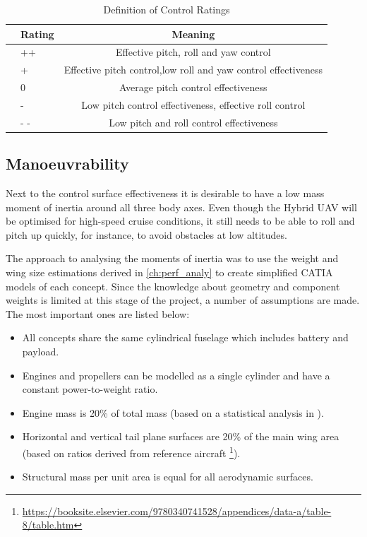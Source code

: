 \begin{table}[H]
\centering
\caption{Definition of Control Ratings}
\label{tab:dcr}
    \begin{tabular}{llc}
        \toprule
            &\textbf{Rating}           & \textbf{Meaning}
        \\ \midrule
          & ++            &  Effective pitch, roll and yaw control      
        \\ \hdashline
          & +               & Effective pitch control,low roll and yaw control effectiveness
        \\ \hdashline
          & 0          & Average pitch control effectiveness
        \\ \hdashline
          & -           & Low pitch control effectiveness, effective roll control
        \\ \hdashline
          & - -    & Low pitch and roll control effectiveness
        \\ \bottomrule
    \end{tabular}
\end{table}

\subsection{Manoeuvrability}

Next to the control surface effectiveness it is desirable to have a low mass moment of inertia around all three body axes. Even though the Hybrid UAV will be optimised for high-speed cruise conditions, it still needs to be able to roll and pitch up quickly, for instance, to avoid obstacles at low altitudes.

The approach to analysing the moments of inertia was to use the weight and wing size estimations derived in \autoref{ch:perf_analy} to create simplified CATIA models of each concept. Since the knowledge about geometry and component weights is limited at this stage of the project, a number of assumptions are made. The most important ones are listed below:

\begin{itemize}%
    \item All concepts share the same cylindrical fuselage which includes battery and payload.
    \item Engines and propellers can be modelled as a single cylinder and have a constant power-to-weight ratio.
    \item Engine mass is 20\% of total mass (based on a statistical analysis in \cite{Wei_2017}).
    \item Horizontal and vertical tail plane surfaces are 20\% of the main wing area (based on ratios derived from reference aircraft \footnote{\url{https://booksite.elsevier.com/9780340741528/appendices/data-a/table-8/table.htm}}).
    \item Structural mass per unit area is equal for all aerodynamic surfaces.
\end{itemize}

